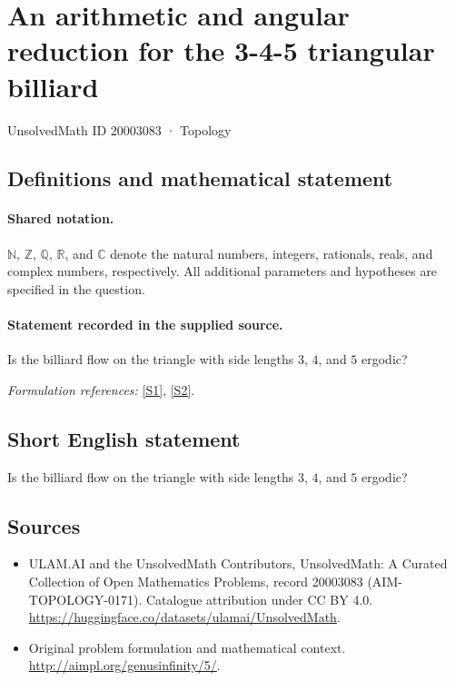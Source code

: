 \documentclass[11pt]{article}
\newcommand{\sref}[2]{\hyperlink{source:#1:#2}{[S#2]}}
\begin{document}
\setcounter{section}{20003082}
\section{An arithmetic and angular reduction for the 3-4-5 triangular billiard}\label{20003083}
{\small UnsolvedMath ID 20003083 · Topology}
\subsection{Definitions and mathematical statement}

\paragraph{Shared notation.}$\mathbb N$, $\mathbb Z$, $\mathbb Q$, $\mathbb R$, and $\mathbb C$ denote the natural numbers, integers, rationals, reals, and complex numbers, respectively. All additional parameters and hypotheses are specified in the question.


\paragraph{Statement recorded in the supplied source.}
Is the billiard flow on the triangle with side lengths $3$, $4$, and $5$ ergodic?
\par\smallskip\textit{Formulation references:} \sref{20003083}{1}, \sref{20003083}{2}.
\subsection{Short English statement}
Is the billiard flow on the triangle with side lengths $3$, $4$, and $5$ ergodic?
\subsection{Sources}
\begin{itemize}
\item[\hypertarget{source:20003083:1}{S1}] ULAM.AI and the UnsolvedMath Contributors, UnsolvedMath: A Curated Collection of Open Mathematics Problems, record 20003083 (AIM-TOPOLOGY-0171). Catalogue attribution under CC BY 4.0.
\url{https://huggingface.co/datasets/ulamai/UnsolvedMath}.
\item[\hypertarget{source:20003083:2}{S2}] Original problem formulation and mathematical context.
\url{http://aimpl.org/genusinfinity/5/}.
\end{itemize}
\label{end:20003083}
\end{document}
